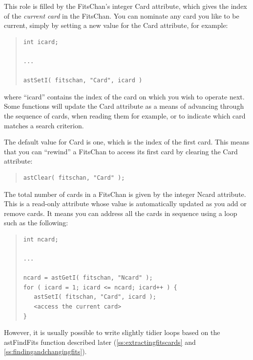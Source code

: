 \documentclass[twoside,11pt]{article}
\newcommand{\htmlref}[2]{#1}
\newcommand{\secref}[1]{\S\ref{#1}}
\renewcommand{\secref}[1]{\ref{#1}}
\begin{document}
This role is filled by the FitsChan's integer \htmlref{Card}{Card} attribute, which
gives the index of the {\em{current card}} in the FitsChan.  You can
nominate any card you like to be current, simply by setting a new
value for the Card attribute, for example:

\begin{quote}
\small
\begin{verbatim}
int icard;

...

astSetI( fitschan, "Card", icard )
\end{verbatim}
\normalsize
\end{quote}

where ``icard'' contains the index of the card on which you wish to
operate next.  Some functions will update the Card attribute as a
means of advancing through the sequence of cards, when reading them
for example, or to indicate which card matches a search criterion.

The default value for Card is one, which is the index of the first
card. This means that you can ``rewind'' a FitsChan to access its
first card by clearing the Card attribute:

\begin{quote}
\small
\begin{verbatim}
astClear( fitschan, "Card" );
\end{verbatim}
\normalsize
\end{quote}

The total number of cards in a FitsChan is given by the integer \htmlref{Ncard}{Ncard}
attribute. This is a read-only attribute whose value is automatically
updated as you add or remove cards. It means you can address all the
cards in sequence using a loop such as the following:

\begin{quote}
\small
\begin{verbatim}
int ncard;

...

ncard = astGetI( fitschan, "Ncard" );
for ( icard = 1; icard <= ncard; icard++ ) {
   astSetI( fitschan, "Card", icard );
   <access the current card>
}
\end{verbatim}
\normalsize
\end{quote}

However, it is usually possible to write slightly tidier loops based
on the \htmlref{astFindFits}{astFindFits} function described later
(\secref{ss:extractingfitscards} and
\secref{ss:findingandchangingfits}).
\end{document}
